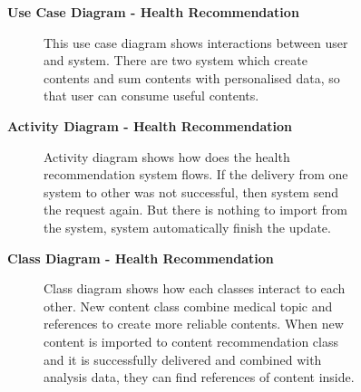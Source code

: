 \documentclass{article}
\begin{document}
		\begin{figure}[htbp]
			\textbf{Use Case Diagram - Health Recommendation}
			\centering
			\begin{subfigure}{\textwidth}
				\resizebox{\textwidth}{!}{}
			\end{subfigure}
			\begin{subfigure}{\textwidth}
				This use case diagram shows interactions between user and system. There are two system which create contents and sum contents with personalised data, so that user can consume useful contents.
			\end{subfigure}
		\end{figure}
		\clearpage
		

		\begin{figure}[htbp]
			\textbf{Activity Diagram - Health Recommendation}
			\centering
			\begin{subfigure}{\textwidth}
				\resizebox{\textwidth}{!}{}
			\end{subfigure}
			\begin{subfigure}{\textwidth}
				Activity diagram shows how does the health recommendation system flows. If the delivery from one system to other was not successful, then system send the request again. But there is nothing to import from the system, system automatically finish the update.
			\end{subfigure}
		\end{figure}
		\clearpage
		
		\begin{figure}[htbp]
			\textbf{Class Diagram - Health Recommendation}
			\centering
			\begin{subfigure}{\textwidth}
				\resizebox{\textwidth}{!}{}
			\end{subfigure}
			\begin{subfigure}{\textwidth}
				Class diagram shows how each classes interact to each other. New content class combine medical topic and references to create more reliable contents. When new content is imported to content recommendation class and it is successfully delivered and combined with analysis data, they can find references of content inside.
			\end{subfigure}
		\end{figure}
		\clearpage
		
\end{document}
